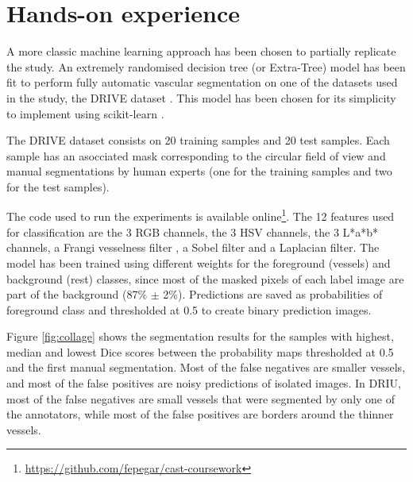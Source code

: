 \section{Hands-on experience}



A more classic machine learning approach has been chosen to partially replicate the study. An extremely randomised decision tree (or Extra-Tree) \cite{geurts_extremely_2006} model has been fit to perform fully automatic vascular segmentation on one of the datasets used in the study, the DRIVE dataset \cite{staal_ridge-based_2004}. This model has been chosen for its simplicity to implement using scikit-learn \cite{pedregosa_scikit-learn:_2011}.



The DRIVE dataset consists on 20 training samples and 20 test samples. Each sample has an asocciated mask corresponding to the circular field of view and manual segmentations by human experts (one for the training samples and two for the test samples).

The code used to run the experiments is available online\footnote{\href{https://github.com/fepegar/cast-coursework}{https://github.com/fepegar/cast-coursework}}. The 12 features used for classification are the 3 RGB channels, the 3 HSV channels, the 3 L*a*b* channels, a Frangi vesselness filter \cite{frangi_multiscale_1998}, a Sobel filter and a Laplacian filter. The model has been trained using different weights for the foreground (vessels) and background (rest) classes, since most of the masked pixels of each label image are part of the background (87\% $\pm$ 2\%). Predictions are saved as probabilities of foreground class and thresholded at 0.5 to create binary prediction images.



Figure \ref{fig:collage} shows the segmentation results for the samples with highest, median and lowest Dice scores between the probability maps thresholded at 0.5 and the first manual segmentation. Most of the false negatives are smaller vessels, and most of the false positives are noisy predictions of isolated images. In DRIU, most of the false negatives are small vessels that were segmented by only one of the annotators, while most of the false positives are borders around the thinner vessels.

